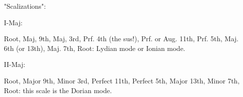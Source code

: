 "Scalizations":

I-Maj:

Root, Maj, 9th, Maj, 3rd, Prf. 4th (the sus!), Prf. or Aug. 11th, 
Prf. 5th, Maj. 6th (or 13th), Maj. 7th, Root: Lydian mode or Ionian mode. %

II-Maj:

Root, Major 9th, Minor 3rd, Perfect 11th, Perfect 5th, 
Major 13th, Minor 7th, Root: this scale is the Dorian mode.

